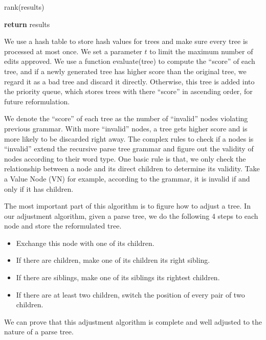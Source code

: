 \documentclass[twocolumn]{article}
\begin{document}
\begin{enumerate}
{	rank(results)
	
	\textbf{return} results
	}
	
	We use a hash table to store hash values for trees and make sure every tree is processed at most once. We set a parameter $t$ to limit the maximum number of edits approved. We use a function evaluate(tree) to compute the ``score'' of each tree, and if a newly generated tree has higher score than the original tree, we regard it as a bad tree and discard it directly. Otherwise, this tree is added into the priority queue, which stores trees with there ``score'' in ascending order, for future reformulation.
	
	We denote the ``score'' of each tree as the number of ``invalid'' nodes violating previous grammar. With more ``invalid'' nodes, a tree gets higher score and is more likely to be discarded right away. The complex rules to check if a nodes is ``invalid'' extend the recursive parse tree grammar and figure out the validity of nodes according to their word type. One basic rule is that, we only check the relationship between a node and its direct children to determine its validity. Take a Value Node (VN) for example, according to the grammar, it is invalid if and only if it has children.
	
	The most important part of this algorithm is to figure how to adjust a tree. In our adjustment algorithm, given a parse tree, we do the following 4 steps to each node and store the reformulated tree.
	
	\begin{itemize}
		\item Exchange this node with one of its children.
		\item If there are children, make one of its children its right sibling.
		\item If there are siblings, make one of its siblings its rightest children.
		\item If there are at least two children, switch the position of every pair of two children.
	\end{itemize}
	
	We can prove that this adjustment algorithm is complete and well adjusted to the nature of a parse tree.
\end{enumerate}
\end{document}
